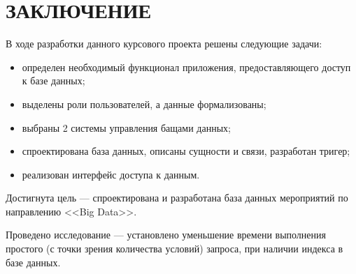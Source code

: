\section*{ЗАКЛЮЧЕНИЕ}

В ходе разработки данного курсового проекта решены следующие задачи:
\begin{itemize}[label=---]
	\item определен необходимый функционал приложения, предоставляющего доступ к базе данных;
	\item выделены роли пользователей, а данные формализованы;
	\item выбраны 2 системы управления бащами данных;
	\item спроектирована база данных, описаны сущности и связи, разработан тригер;
	\item реализован интерфейс доступа к данным.
\end{itemize}

Достигнута цель --- спроектирована и разработана база данных мероприятий по направлению <<Big Data>>. 

Проведено исследование --- установлено уменьшение времени выполнения простого (с точки зрения количества условий) запроса, при наличии индекса в базе данных.

\pagebreak

